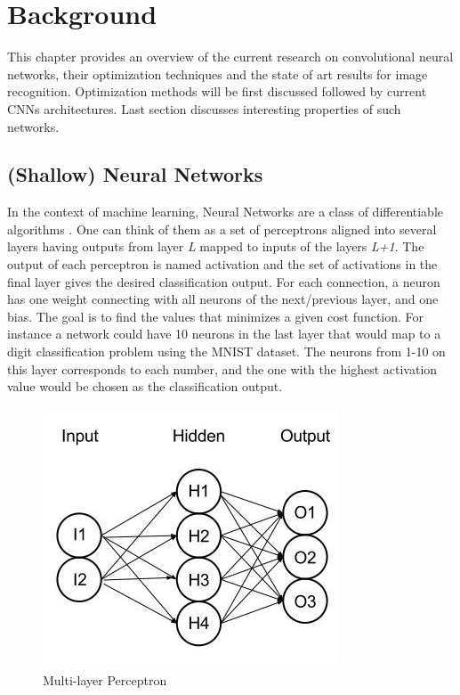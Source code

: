 \chapter{Background}

This chapter provides an  overview of the current research on convolutional neural networks, their optimization techniques and the state of art results for image recognition. Optimization methods will be first discussed followed by current CNNs architectures. Last section discusses interesting properties of such networks.

\section{ (Shallow) Neural Networks}

In the context of machine learning, Neural Networks are a class of differentiable algorithms \cite{bishop1995neural}. One can think of them as a set of perceptrons aligned into several layers having outputs from layer \textit{L} mapped to inputs of the layers \textit{L+1}. The output of each perceptron is named activation and the set of activations in the final layer gives the desired classification output. For each connection, a neuron has one weight connecting with all neurons of the next/previous layer, and one bias. The goal is to find the values that minimizes a given cost function. For instance a network could have 10 neurons in the last layer that would map to a digit classification problem using the MNIST \cite{lecun1998mnist} dataset. The neurons from 1-10 on this layer corresponds to each number, and the one with the highest activation value would be chosen as the classification output.

\begin{figure}[h!]
\centering
	\includegraphics[scale=0.5]{mlnet.png}
\caption{Multi-layer Perceptron}
\label{fig:mlnet}
\end{figure}



